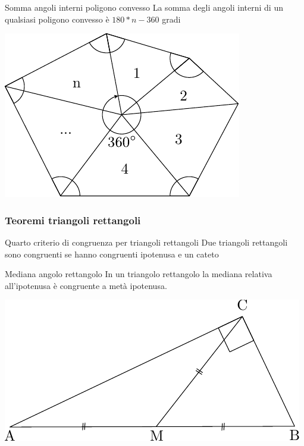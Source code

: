 \begin{teorema}{Somma angoli interni poligono convesso}
	La somma degli angoli interni di un qualsiasi poligono convesso è $ 180 * n - 360 $ gradi
	\begin{center}
		\includegraphics{Images/Geometria/Somma angoli.pdf }
	\end{center}
\end{teorema}
\subsubsection{Teoremi triangoli rettangoli}
\begin{teorema}{Quarto criterio di congruenza per triangoli rettangoli}
	Due triangoli rettangoli sono congruenti se hanno congruenti ipotenusa e un cateto
\end{teorema}
\begin{teorema}{Mediana angolo rettangolo}
	In un triangolo rettangolo la mediana relativa all’ipotenusa è congruente a metà ipotenusa.
	\begin{center}
		\includegraphics{Images/Geometria/Mediama.pdf }
	\end{center}
\end{teorema}
